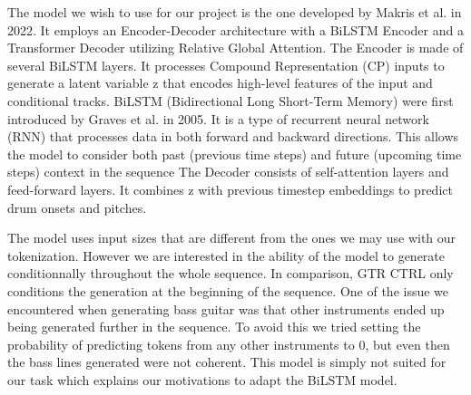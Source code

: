 The model we wish to use for our project is the one developed by Makris et al. in 2022\cite{makris_conditional_2022}.
It employs an Encoder-Decoder architecture with a BiLSTM Encoder and a Transformer Decoder utilizing Relative Global Attention.
The Encoder is made of several BiLSTM layers. It processes Compound Representation (CP) inputs to generate a latent variable z that encodes high-level features of the input and conditional tracks.
BiLSTM (Bidirectional Long Short-Term Memory) were first introduced by Graves et al. in 2005\cite{graves_framewise_2005}. It is a type of recurrent neural network (RNN) that processes data in both forward and backward directions.
This allows the model to consider both past (previous time steps) and future (upcoming time steps) context in the sequence
The Decoder consists of self-attention layers and feed-forward layers. 
It combines z with previous timestep embeddings to predict drum onsets and pitches.



The model uses input sizes that are different from the ones we may use with our tokenization.
However we are interested in the ability of the model to generate conditionnally throughout the whole sequence.
In comparison, GTR CTRL only conditions the generation at the beginning of the sequence.
One of the issue we encountered when generating bass guitar was that other instruments ended up being generated further in the sequence.
To avoid this we tried setting the probability of predicting tokens from any other instruments to 0, but even then the bass lines generated were not coherent.
This model is simply not suited for our task which explains our motivations to adapt the BiLSTM model.

